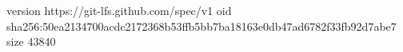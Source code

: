 version https://git-lfs.github.com/spec/v1
oid sha256:50ea2134700acdc2172368b53ffb5bb7ba18163e0db47ad6782f33fb92d7abe7
size 43840
